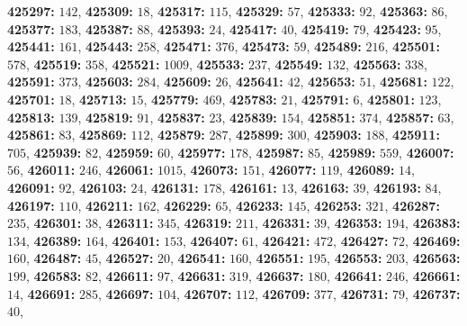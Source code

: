 \textsf{\bfseries 425297:} $142$, \textsf{\bfseries 425309:} $18$, \textsf{\bfseries 425317:} $115$, \textsf{\bfseries 425329:} $57$, \textsf{\bfseries 425333:} $92$, \textsf{\bfseries 425363:} $86$, \textsf{\bfseries 425377:} $183$, \textsf{\bfseries 425387:} $88$, \textsf{\bfseries 425393:} $24$, \textsf{\bfseries 425417:} $40$, \textsf{\bfseries 425419:} $79$, \textsf{\bfseries 425423:} $95$, \textsf{\bfseries 425441:} $161$, \textsf{\bfseries 425443:} $258$, \textsf{\bfseries 425471:} $376$, \textsf{\bfseries 425473:} $59$, \textsf{\bfseries 425489:} $216$, \textsf{\bfseries 425501:} $578$, \textsf{\bfseries 425519:} $358$, \textsf{\bfseries 425521:} $1009$, \textsf{\bfseries 425533:} $237$, \textsf{\bfseries 425549:} $132$, \textsf{\bfseries 425563:} $338$, \textsf{\bfseries 425591:} $373$, \textsf{\bfseries 425603:} $284$, \textsf{\bfseries 425609:} $26$, \textsf{\bfseries 425641:} $42$, \textsf{\bfseries 425653:} $51$, \textsf{\bfseries 425681:} $122$, \textsf{\bfseries 425701:} $18$, \textsf{\bfseries 425713:} $15$, \textsf{\bfseries 425779:} $469$, \textsf{\bfseries 425783:} $21$, \textsf{\bfseries 425791:} $6$, \textsf{\bfseries 425801:} $123$, \textsf{\bfseries 425813:} $139$, \textsf{\bfseries 425819:} $91$, \textsf{\bfseries 425837:} $23$, \textsf{\bfseries 425839:} $154$, \textsf{\bfseries 425851:} $374$, \textsf{\bfseries 425857:} $63$, \textsf{\bfseries 425861:} $83$, \textsf{\bfseries 425869:} $112$, \textsf{\bfseries 425879:} $287$, \textsf{\bfseries 425899:} $300$, \textsf{\bfseries 425903:} $188$, \textsf{\bfseries 425911:} $705$, \textsf{\bfseries 425939:} $82$, \textsf{\bfseries 425959:} $60$, \textsf{\bfseries 425977:} $178$, \textsf{\bfseries 425987:} $85$, \textsf{\bfseries 425989:} $559$, \textsf{\bfseries 426007:} $56$, \textsf{\bfseries 426011:} $246$, \textsf{\bfseries 426061:} $1015$, \textsf{\bfseries 426073:} $151$, \textsf{\bfseries 426077:} $119$, \textsf{\bfseries 426089:} $14$, \textsf{\bfseries 426091:} $92$, \textsf{\bfseries 426103:} $24$, \textsf{\bfseries 426131:} $178$, \textsf{\bfseries 426161:} $13$, \textsf{\bfseries 426163:} $39$, \textsf{\bfseries 426193:} $84$, \textsf{\bfseries 426197:} $110$, \textsf{\bfseries 426211:} $162$, \textsf{\bfseries 426229:} $65$, \textsf{\bfseries 426233:} $145$, \textsf{\bfseries 426253:} $321$, \textsf{\bfseries 426287:} $235$, \textsf{\bfseries 426301:} $38$, \textsf{\bfseries 426311:} $345$, \textsf{\bfseries 426319:} $211$, \textsf{\bfseries 426331:} $39$, \textsf{\bfseries 426353:} $194$, \textsf{\bfseries 426383:} $134$, \textsf{\bfseries 426389:} $164$, \textsf{\bfseries 426401:} $153$, \textsf{\bfseries 426407:} $61$, \textsf{\bfseries 426421:} $472$, \textsf{\bfseries 426427:} $72$, \textsf{\bfseries 426469:} $160$, \textsf{\bfseries 426487:} $45$, \textsf{\bfseries 426527:} $20$, \textsf{\bfseries 426541:} $160$, \textsf{\bfseries 426551:} $195$, \textsf{\bfseries 426553:} $203$, \textsf{\bfseries 426563:} $199$, \textsf{\bfseries 426583:} $82$, \textsf{\bfseries 426611:} $97$, \textsf{\bfseries 426631:} $319$, \textsf{\bfseries 426637:} $180$, \textsf{\bfseries 426641:} $246$, \textsf{\bfseries 426661:} $14$, \textsf{\bfseries 426691:} $285$, \textsf{\bfseries 426697:} $104$, \textsf{\bfseries 426707:} $112$, \textsf{\bfseries 426709:} $377$, \textsf{\bfseries 426731:} $79$, \textsf{\bfseries 426737:} $40$, 
